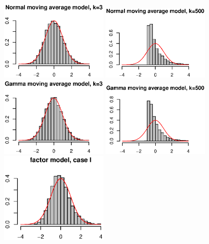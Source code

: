 \documentclass[review]{elsarticle}
\theoremstyle{plain}
\theoremstyle{definition}
\theoremstyle{remark}
\begin{document}
\begin{figure}[htbp]
    \centering
    \includegraphics[width=0.48\textwidth]{Fig2}
    \includegraphics[width=0.48\textwidth]{Fig3}\\
    \includegraphics[width=0.48\textwidth]{Fig4}
    \includegraphics[width=0.48\textwidth]{Fig5}\\
    \includegraphics[width=0.48\textwidth]{Fig6}

\end{figure}
\end{document}
